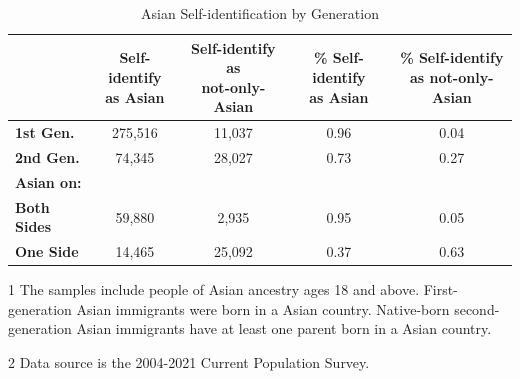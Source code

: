 \begin{table}[H]
\centering\centering
\caption{Asian Self-identification by Generation \label{tab:asianbygen-adults}}
\centering
\begin{threeparttable}
\begin{tabular}[t]{>{}lcccc}
\toprule
  & \specialcell{Self-identify \\ as Asian} & \specialcell{Self-identify as \\ not-only-Asian} & \specialcell{\% Self-identify \\ as Asian} & \specialcell{\% Self-identify \\ as not-only-Asian}\\
\midrule
\textbf{1st Gen.} & 275,516 & 11,037 & 0.96 & 0.04\\
\textbf{2nd Gen.} & 74,345 & 28,027 & 0.73 & 0.27\\
\hspace{1em}\textbf{Asian on:} &  &  &  & \\
\hspace{1em}\hspace{1em}\textbf{Both Sides} & 59,880 & 2,935 & 0.95 & 0.05\\
\hspace{1em}\hspace{1em}\textbf{One Side} & 14,465 & 25,092 & 0.37 & 0.63\\
\bottomrule
\end{tabular}
\begin{tablenotes}
\item[1] The samples include people of Asian ancestry ages 18 and above. First-generation Asian immigrants were born in a Asian country. Native-born second-generation Asian immigrants have at least one parent born in a Asian country. 
\item[2] Data source is the 2004-2021 Current Population Survey.
\end{tablenotes}
\end{threeparttable}
\end{table}
